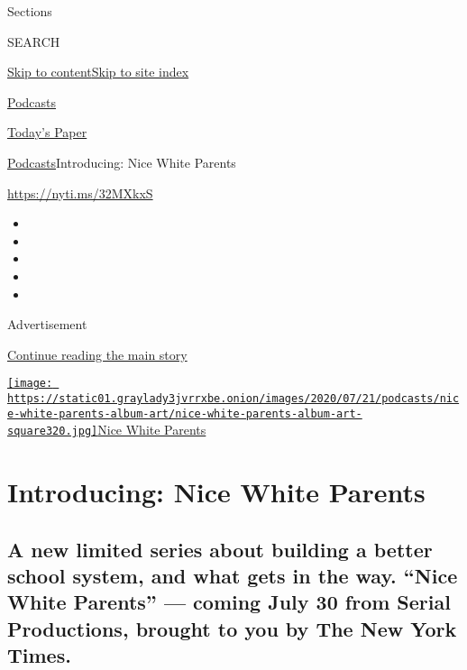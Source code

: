 Sections

SEARCH

\protect\hyperlink{site-content}{Skip to
content}\protect\hyperlink{site-index}{Skip to site index}

\href{https://www.nytimes3xbfgragh.onion/spotlight/podcasts}{Podcasts}

\href{https://myaccount.nytimes3xbfgragh.onion/auth/login?response_type=cookie\&client_id=vi}{}

\href{https://www.nytimes3xbfgragh.onion/section/todayspaper}{Today's
Paper}

\href{/spotlight/podcasts}{Podcasts}\textbar{}Introducing: Nice White
Parents

\href{https://nyti.ms/32MXkxS}{https://nyti.ms/32MXkxS}

\begin{itemize}
\item
\item
\item
\item
\item
\end{itemize}

Advertisement

\protect\hyperlink{after-top}{Continue reading the main story}

\href{https://www.nytimes3xbfgragh.onion/column/nice-white-parents}{\texttt{[image: https://static01.graylady3jvrrxbe.onion/images/2020/07/21/podcasts/nice-white-parents-album-art/nice-white-parents-album-art-square320.jpg]}Nice
White Parents}

\hypertarget{introducing-nice-white-parents}{%
\section{Introducing: Nice White
Parents}\label{introducing-nice-white-parents}}

\hypertarget{a-new-limited-series-about-building-a-better-school-system-and-what-gets-in-the-way-nice-white-parents--coming-july-30-from-serial-productions-brought-to-you-by-the-new-york-times}{%
\subsection{A new limited series about building a better school system,
and what gets in the way. ``Nice White Parents'' --- coming July 30 from
Serial Productions, brought to you by The New York
Times.}\label{a-new-limited-series-about-building-a-better-school-system-and-what-gets-in-the-way-nice-white-parents--coming-july-30-from-serial-productions-brought-to-you-by-the-new-york-times}}

